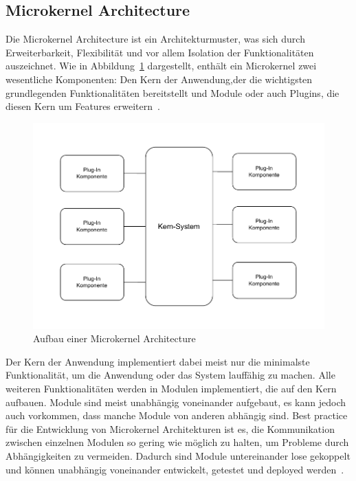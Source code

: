 \documentclass[acmtog]{acmart}
\begin{document}
\subsection{Microkernel Architecture}\label{subsec:microkernel-architecture}
Die Microkernel Architecture ist ein Architekturmuster, was sich durch Erweiterbarkeit, Flexibilität und vor allem Isolation der Funktionalitäten auszeichnet.
Wie in Abbildung~\ref{fig:microkernel} dargestellt, enthält ein Microkernel zwei wesentliche Komponenten: Den Kern der Anwendung,der die wichtigsten grundlegenden Funktionalitäten bereitstellt und Module oder auch Plugins,
die diesen Kern um Features erweitern~\cite[21-22]{architecturePatterns}.


\begin{figure}[!h]
  \centering
  \includegraphics[width=\linewidth]{images/microkernel/microkernel}
  \caption{Aufbau einer Microkernel Architecture}
  \label{fig:microkernel}
\end{figure}

Der Kern der Anwendung implementiert dabei meist nur die minimalste Funktionalität, um die Anwendung oder das System lauffähig zu machen.
Alle weiteren Funktionalitäten werden in Modulen implementiert, die auf den Kern aufbauen.
Module sind meist unabhängig voneinander aufgebaut, es kann jedoch auch vorkommen, dass manche Module von anderen abhängig sind.
Best practice für die Entwicklung von Microkernel Architekturen ist es, die Kommunikation zwischen einzelnen Modulen so gering wie möglich zu halten, um Probleme durch Abhängigkeiten zu vermeiden.
Dadurch sind Module untereinander lose gekoppelt und können unabhängig voneinander entwickelt, getestet und deployed werden~\cite[22]{architecturePatterns}.
\end{document}
